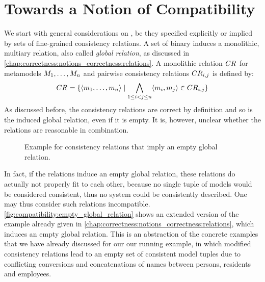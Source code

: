 \section{Towards a Notion of Compatibility}
\label{chap:compatibility:informal}

We start with general considerations on \modellevelconsistencyrelations, be they specified explicitly or implied by sets of fine-grained consistency relations.
A set of binary \modellevelconsistencyrelations induces a monolithic, multiary relation, also called \emph{global relation}, as discussed in \autoref{chap:correctness:notions_correctness:relations}.
A monolithic relation $\consistencyrelation{CR}{}$ for metamodels $\metamodelsequence{M}{n}$ and pairwise consistency relations $\consistencyrelation{CR}{i,j}$ is defined by:
\begin{align*}
    \consistencyrelation{CR}{} = \setted{\tupled{\model{m}{1}, \dots, \model{m}{n}} \mid \bigwedge\limits_{1 \le i < j \le n} \tupled{\model{m}{i}, \model{m}{j}} \in \consistencyrelation{CR}{i,j}}
\end{align*}
As discussed before, the consistency relations are correct by definition and so is the induced global relation, even if it is empty.
It is, however, unclear whether the relations are reasonable in combination.

\begin{figure}
    \centering
    
    \caption[Consistency relations that imply an empty global relation]{Example for consistency relations that imply an empty global relation.}
    \label{fig:compatibility:empty_global_relation}
\end{figure}

In fact, if the relations induce an empty global relation, these relations do actually not properly fit to each other, because no single tuple of models would be considered consistent, thus no system could be consistently described.
One may thus consider such relations incompatible.
\autoref{fig:compatibility:empty_global_relation} shows an extended version of the example already given in \autoref{chap:correctness:notions_correctness:relations}, which induces an empty global relation.
This is an abstraction of the concrete examples that we have already discussed for our our running example, in which modified consistency relations lead to an empty set of consistent model tuples due to conflicting conversions and concatenations of names between persons, residents and employees.

